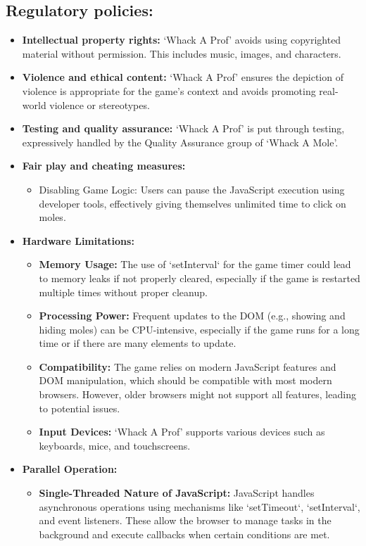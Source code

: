 \documentclass{article}
\begin{document}
\subsection{Regulatory policies:}
\begin{itemize}
    \item \textbf{Intellectual property rights:} ‘Whack A Prof’ avoids using copyrighted material without permission. This includes music, images, and characters.
    \item \textbf{Violence and ethical content:} ‘Whack A Prof’ ensures the depiction of violence is appropriate for the game’s context and avoids promoting real-world violence or stereotypes.
    \item \textbf{Testing and quality assurance:} ‘Whack A Prof’ is put through testing, expressively handled by the Quality Assurance group of ‘Whack A Mole’.
    \item \textbf{Fair play and cheating measures:}
    \begin{itemize}
        \item Disabling Game Logic: Users can pause the JavaScript execution using developer tools, effectively giving themselves unlimited time to click on moles.
    \end{itemize}
    \item \textbf{Hardware Limitations:}
    \begin{itemize}
        \item \textbf{Memory Usage:} The use of `setInterval` for the game timer could lead to memory leaks if not properly cleared, especially if the game is restarted multiple times without proper cleanup.
        \item \textbf{Processing Power:} Frequent updates to the DOM (e.g., showing and hiding moles) can be CPU-intensive, especially if the game runs for a long time or if there are many elements to update.
        \item \textbf{Compatibility:} The game relies on modern JavaScript features and DOM manipulation, which should be compatible with most modern browsers. However, older browsers might not support all features, leading to potential issues.
        \item \textbf{Input Devices:} ‘Whack A Prof’ supports various devices such as keyboards, mice, and touchscreens.
    \end{itemize}
    \item \textbf{Parallel Operation:}
    \begin{itemize}
        \item \textbf{Single-Threaded Nature of JavaScript:} JavaScript handles asynchronous operations using mechanisms like `setTimeout`, `setInterval`, and event listeners. These allow the browser to manage tasks in the background and execute callbacks when certain conditions are met.

\end{itemize}
\end{itemize}
\end{document}
